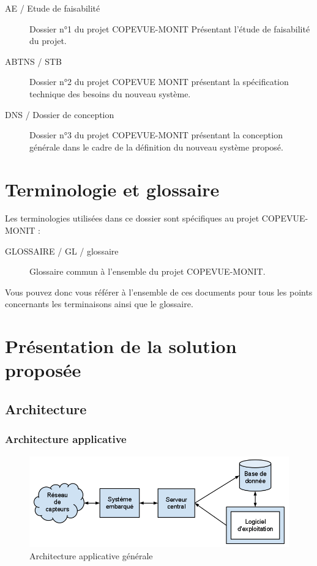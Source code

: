 \documentclass{mise_en_page}
\begin{document}
\begin{description}
	\item[AE / Etude de faisabilité] Dossier n°1 du projet COPEVUE-MONIT Présentant l'étude de faisabilité du projet.
	\item[ABTNS / STB ] Dossier n°2 du projet COPEVUE MONIT présentant la spécification technique des besoins du nouveau système.
	\item[DNS / Dossier de conception ] Dossier n°3 du projet COPEVUE-MONIT présentant la conception générale dans le cadre de la définition du nouveau système proposé.
\end{description}

\section{Terminologie et glossaire}

Les terminologies utilisées dans ce dossier sont spécifiques au projet COPEVUE-MONIT :

\begin{description}
	\item[GLOSSAIRE / GL / glossaire ] Glossaire commun à l'ensemble du projet COPEVUE-MONIT.
\end{description}

Vous pouvez donc vous référer à l'ensemble de ces documents pour tous les points concernants les terminaisons ainsi que le glossaire.

\section{Présentation de la solution proposée}

\subsection{Architecture}

\subsubsection{Architecture applicative}

\begin{figure}[H]
	\centering
	\includegraphics[width=150mm]{archi_app.png}
	\caption{Architecture applicative générale}
\end{figure}
\end{document}
